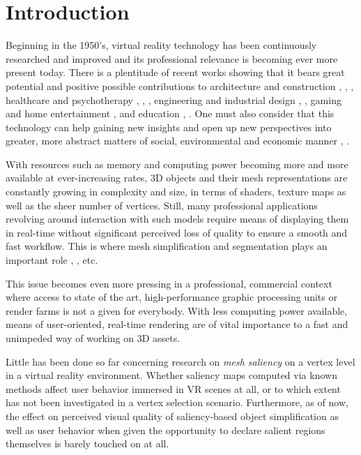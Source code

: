 \chapter{Introduction}
\label{sec:introduction}

Beginning in the 1950's, virtual reality technology \cite{steuer1992defining} has been continuously researched and improved and its professional relevance is becoming ever more present today. There is a plentitude of recent works showing that it bears great potential and positive possible contributions to architecture and construction \cite{sampaio2014application}, \cite{le2015social}, \cite{stouffs2013happening}, healthcare and psychotherapy \cite{baus2014moving}, \cite{merians2014rehabilitation}, \cite{de2014healthcare}, engineering and industrial design \cite{marks2014towards}, \cite{wendrich2016hybrid}, gaming and home entertainment \cite{valente2016live}, \cite{zyda2005visual} and education \cite{merchant2014effectiveness}, \cite{ott2015literature}. One must also consider that this technology can help gaining new insights and open up new perspectives into greater, more abstract matters of social, environmental and economic manner \cite{ovtcharova2015innovation}, \cite{nguyen2016applying}. 

With resources such as memory and computing power becoming more and more available at ever-increasing rates, 3D objects and their mesh representations are constantly growing in complexity and size, in terms of shaders, texture maps as well as the sheer number of vertices. Still, many professional applications revolving around interaction with such models require means of displaying them in real-time without significant perceived loss of quality to ensure a smooth and fast workflow. This is where mesh simplification and segmentation plays an important role \cite{wei2010feature}, \cite{shaffer2001efficient}, \cite{zhao2012saliency} etc.

This issue becomes even more pressing in a professional, commercial context where access to state of the art, high-performance graphic processing units or render farms is not a given for everybody. With less computing power available, means of user-oriented, real-time rendering are of vital importance to a fast and unimpeded way of working on 3D assets.

Little has been done so far concerning research on \textit{mesh saliency} on a vertex level in a virtual reality environment. Whether saliency maps computed via known methods affect user behavior immersed in VR scenes at all, or to which extent has not been investigated in a vertex selection scenario. Furthermore, as of now, the effect on perceived visual quality of saliency-based object simplification as well as user behavior when given the opportunity to declare salient regions themselves is barely touched on at all.

